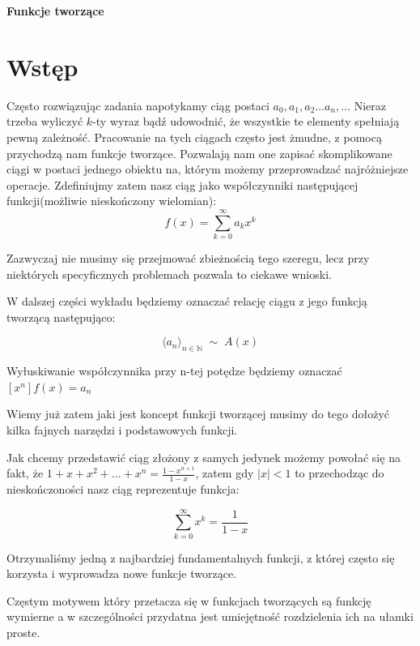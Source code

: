 \documentclass{lecture-kuznia}
\def\title{Funkcje tworzące}
\begin{document}
\begin{center}{\Huge\textbf{\title}}\end{center}
	
	\fontsize{12}{16}\selectfont
		

        \section{\Huge Wstęp}
        Często rozwiązując zadania napotykamy ciąg postaci \(a_0, a_1, a_2 \ldots a_n, \ldots\) Nieraz trzeba wyliczyć \(k\)-ty wyraz bądź udowodnić, że wszystkie te elementy spełniają pewną zależność. Pracowanie na tych ciągach często jest żmudne, z pomocą przychodzą nam funkcje tworzące. Pozwalają nam one zapisać skomplikowane ciągi w postaci jednego obiektu na, którym możemy przeprowadzać najróżniejsze operacje.
        Zdefiniujmy zatem nasz ciąg jako współczynniki następującej funkcji(możliwie nieskończony wielomian): 
        \[f(x) = \sum_{k = 0}^{\infty}a_kx^k\]

        Zazwyczaj nie musimy się przejmować zbieżnością tego szeregu, lecz przy niektórych specyficznych problemach pozwala to ciekawe wnioski.

        W dalszej części wykładu będziemy oznaczać relację ciągu z jego funkcją tworzącą następująco:

        \[\langle a_n \rangle_{n \in \mathbb{N}} \; \sim \; A(x)\]

        Wyłuskiwanie współczynnika przy n-tej potędze będziemy oznaczać \([x^n]f(x) = a_n\)
        
        Wiemy już zatem jaki jest koncept funkcji tworzącej musimy do tego dołożyć kilka fajnych narzędzi i podstawowych funkcji.

        Jak chcemy przedstawić ciąg złożony z samych jedynek możemy powołać się na fakt, że \(1+x+x^2+\ldots+x^n = \frac{1-x^{n+1}}{1-x}\), zatem gdy \(|x| < 1\) to przechodząc do nieskończoności nasz ciąg reprezentuje funkcja:

        \[\sum_{k=0}^{\infty} x^k = \frac{1}{1-x}\]

        Otrzymaliśmy jedną z najbardziej fundamentalnych funkcji, z której często się korzysta i wyprowadza nowe funkcje tworzące.

        Częstym motywem który przetacza się w funkcjach tworzących są funkcję wymierne a w szczególności przydatna jest umiejętność rozdzielenia ich na ułamki proste.

        
        
\end{document}
